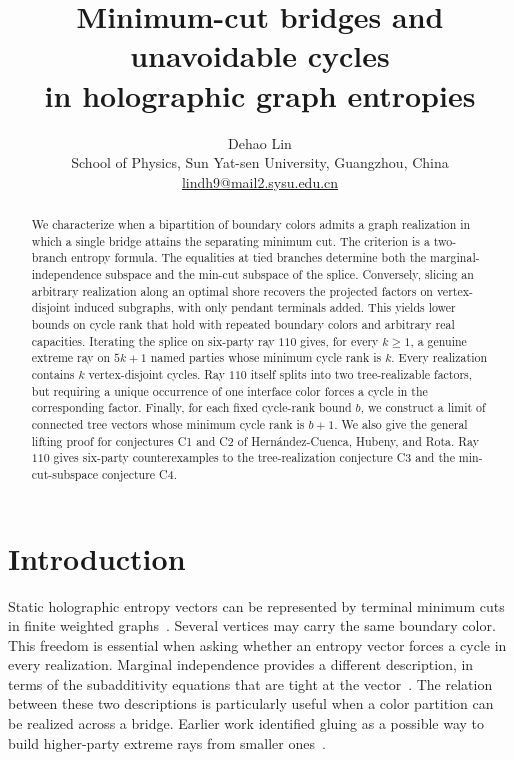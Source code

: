 \documentclass[11pt]{article}
\title{\bfseries Minimum-cut bridges and unavoidable cycles\\
in holographic graph entropies}
\author{Dehao Lin\\[0.4em]
  {\normalsize School of Physics, Sun Yat-sen University, Guangzhou, China}\\
  {\small\href{mailto:lindh9@mail2.sysu.edu.cn}{lindh9@mail2.sysu.edu.cn}}}
\date{}
\begin{document}
\maketitle
\vspace{-1.8em}

\begin{abstract}
We characterize when a bipartition of boundary colors admits a graph
realization in which a single bridge attains the separating minimum cut.
The criterion is a two-branch entropy formula. The equalities at tied
branches determine both the marginal-independence subspace and the
min-cut subspace of the splice. Conversely, slicing an arbitrary
realization along an optimal shore recovers the projected factors on
vertex-disjoint induced subgraphs, with only pendant terminals added.
This yields lower bounds on cycle rank that hold with repeated boundary
colors and arbitrary real capacities. Iterating the splice on six-party
ray \(110\) gives, for every \(k\geq 1\), a genuine extreme ray on
\(5k+1\) named parties whose minimum cycle rank is \(k\). Every realization
contains \(k\) vertex-disjoint cycles. Ray \(110\) itself splits into two
tree-realizable factors, but requiring a unique occurrence of one
interface color forces a cycle in the corresponding factor. Finally,
for each fixed cycle-rank bound \(b\), we construct a limit of connected
tree vectors whose minimum cycle rank is \(b+1\).
We also give the general lifting proof for conjectures C1 and C2
of Hern\'andez-Cuenca, Hubeny, and Rota. Ray \(110\) gives six-party
counterexamples to the tree-realization conjecture C3 and the
min-cut-subspace conjecture C4.
\end{abstract}

\section{Introduction}

Static holographic entropy vectors can be represented by terminal minimum
cuts in finite weighted graphs~\cite{bao2015}. Several vertices may carry
the same boundary color. This freedom is essential when asking whether an
entropy vector forces a cycle in every realization. Marginal independence
provides a different description, in terms of the subadditivity equations
that are tight at the vector~\cite{hhr2022}. The relation between these two
descriptions is particularly useful when a color partition can be
realized across a bridge. Earlier work identified gluing as a possible
way to build higher-party extreme rays from smaller ones~\cite[Sec.~6 and
note~32]{hhj2024}.
\end{document}
